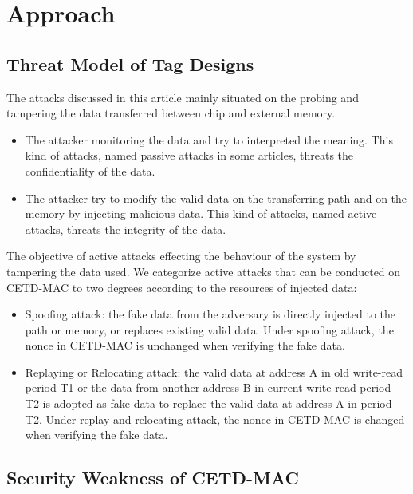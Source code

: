 \documentclass{article}
\begin{document}
\section{Approach}
\subsection{Threat Model of Tag Designs}
The attacks discussed in this article mainly situated on the probing and
tampering the data transferred between chip and external memory. 
\begin{itemize}
	\item The attacker monitoring the data and try to interpreted the meaning.
This kind of attacks, named passive attacks in some articles, threats the confidentiality of the data.
	\item The attacker try to modify the valid data  on the transferring path and on
the memory by injecting malicious data. This kind of attacks, named active attacks, threats the integrity of the data.
\end{itemize}
The objective of active attacks effecting the behaviour of the system by
tampering the data used. We categorize active attacks that can be conducted on
CETD-MAC to two degrees according to the resources of injected data:  
\begin{itemize}
	\item Spoofing attack: the fake data from the adversary is directly injected
to the path or memory, or replaces existing valid data. Under spoofing attack,
the nonce in CETD-MAC is unchanged when verifying the fake data. 
	\item Replaying or Relocating attack: the valid data at address A in old
write-read period T1 or the data from another address B in current write-read
period T2 is adopted as fake data to replace the valid data at address A in period T2.  Under
replay and relocating attack, the nonce in CETD-MAC is changed when verifying
the fake data.
\end{itemize}

\subsection{Security Weakness of CETD-MAC}
\end{document}

